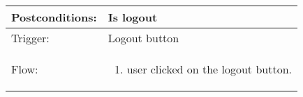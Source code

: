 \begin{longtable}{| p{3.5cm} | p{9cm} |}
\hline
Postconditions: & Is logout\\
\hline
Trigger: & Logout button\\
\hline
Flow: &\mbox{}\par\vspace{-\baselineskip}
\begin{enumerate}
\item user clicked on the logout button.
\end{enumerate}\\
\hline
\end{longtable}
